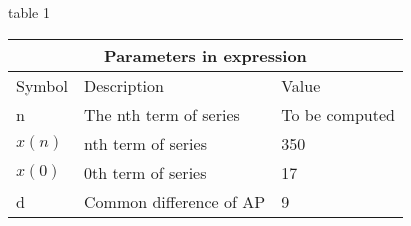 \setlength{\arrayrulewidth}{0.3mm}
\setlength{\tabcolsep}{15pt}
\renewcommand{\arraystretch}{1.5}

table 1\\

\begin{tabular}{ |p{1cm}|p{3cm}|p{1cm}| }
\hline
\multicolumn{3}{|c|}{Parameters in expression}\\
\hline
Symbol & Description & Value\\
\hline
n & The nth term of series & To be computed\\
\hline
$x(n)$ & nth term of series & 350\\
\hline
$x(0)$ & 0th term of series & 17 \\
\hline
d & Common difference of AP & 9\\
\hline
\end{tabular}

